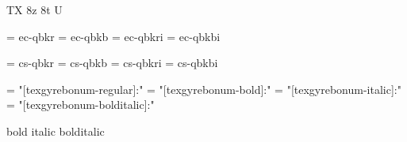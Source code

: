 
\ifx\ffdecl\undefined  \fi

\ffdecl [TG Bonum] {\rm \bf \it \bi} {\caps} {} {TX} {8z 8t U}

\def\caps{\ffsetV{caps}{-sc}\ffsetX}  \def\nocaps{\ffsetV{caps}{}\ffsetX}
\def\capsV{} 

\ismacro{}\ifttrue

   \font\tenrm = ec-qbkr  \sizespec
   \font\tenbf = ec-qbkb  \sizespec
   \font\tenit = ec-qbkri \sizespec
   \font\tenbi = ec-qbkbi \sizespec

   \def\ffnamegen{ec-qbk\ffvarV\capsV}

\fi

\ismacro{}\iftrue

   \font\tenrm = cs-qbkr  \sizespec
   \font\tenbf = cs-qbkb  \sizespec
   \font\tenit = cs-qbkri \sizespec
   \font\tenbi = cs-qbkbi \sizespec

   \def\ffnamegen{cs-qbk\ffvarV\capsV}
   

\fi

\ismacro{}\iftrue

   \font\tenrm = "[texgyrebonum-regular]:\fontfeatures"    \sizespec
   \font\tenbf = "[texgyrebonum-bold]:\fontfeatures"       \sizespec
   \font\tenit = "[texgyrebonum-italic]:\fontfeatures"     \sizespec
   \font\tenbi = "[texgyrebonum-bolditalic]:\fontfeatures" \sizespec

   \def\ffnamegen{"[texgyrebonum-\ffvarV]:\capsV\fontfeatures"} 

    {bold} {italic} {bolditalic}
   \def\caps{\ffsetV{caps}{+smcp;}\ffsetX}

\fi
\tenrm %

\ifx\loadmathfonts\relax \endinput \fi
\ifx\mathpreloaded X\else  \fi                     

\endinput
